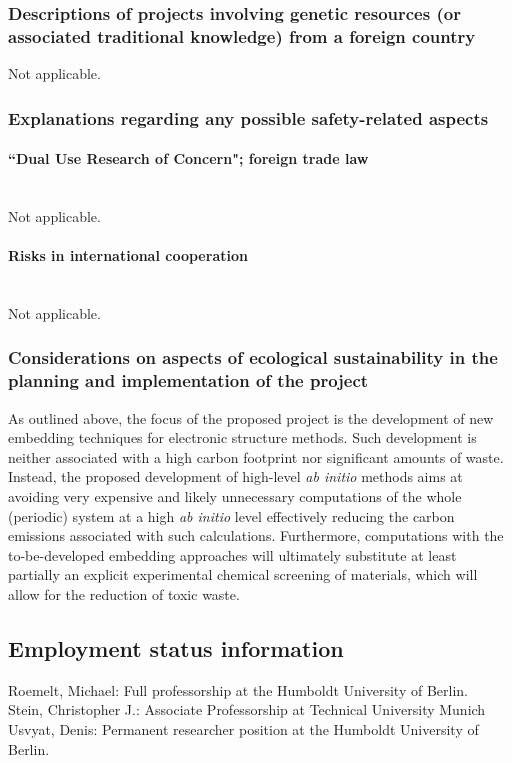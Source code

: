 \documentclass[a4paper,11pt,headings=normal]{scrartcl}
\begin{document}
\begin{itemize}
\subsubsection{Descriptions of projects involving genetic resources (or 
associated traditional knowledge) from a foreign country}
Not applicable.

\subsubsection{Explanations regarding any possible safety-related aspects} 
\paragraph{“Dual Use Research of Concern"; foreign trade law}\ \\
\noindent
Not applicable.

\paragraph{Risks in international cooperation}\ \\
\noindent
Not applicable.

\subsubsection{Considerations on aspects of ecological sustainability in the 
planning and implementation of the project}
As outlined above, the focus of the proposed project is the development of new 
embedding techniques for electronic structure methods. Such development is neither 
associated with a high carbon footprint nor significant amounts of waste. Instead, 
the proposed development of high-level \textit{ab initio} methods aims at 
avoiding very expensive and likely unnecessary computations of the whole 
(periodic) system at a high \textit{ab initio} level effectively reducing the 
carbon emissions associated with such calculations. Furthermore, computations with 
the to-be-developed embedding approaches will ultimately substitute at least 
partially an explicit experimental chemical screening of materials, which will 
allow for the reduction of toxic waste. 


\subsection{Employment status information}
Roemelt, Michael: Full professorship at the Humboldt University of Berlin.\\
Stein, Christopher J.: Associate Professorship at Technical University Munich\\
Usvyat, Denis: Permanent researcher position at the Humboldt University of 
Berlin.


\end{itemize}
\end{document}
